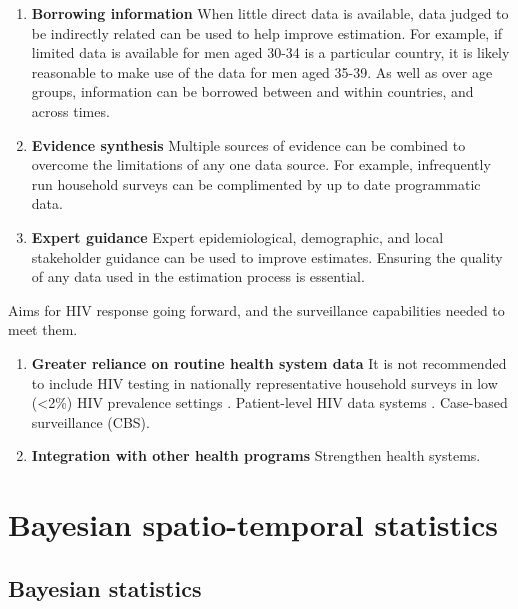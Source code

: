 \documentclass[a4paper, nobind]{templates/ociamthesis}
\providecommand{\tightlist}{%
  \setlength{\itemsep}{0pt}\setlength{\parskip}{0pt}}
\begin{document}
\begin{enumerate}
\def\labelenumi{\arabic{enumi}.}
\tightlist
\item
  \textbf{Borrowing information}
  When little direct data is available, data judged to be indirectly related can be used to help improve estimation.
  For example, if limited data is available for men aged 30-34 is a particular country, it is likely reasonable to make use of the data for men aged 35-39.
  As well as over age groups, information can be borrowed between and within countries, and across times.
\item
  \textbf{Evidence synthesis}
  Multiple sources of evidence can be combined to overcome the limitations of any one data source.
  For example, infrequently run household surveys can be complimented by up to date programmatic data.
\item
  \textbf{Expert guidance}
  Expert epidemiological, demographic, and local stakeholder guidance can be used to improve estimates.
  Ensuring the quality of any data used in the estimation process is essential.
\end{enumerate}

Aims for HIV response going forward, and the surveillance capabilities needed to meet them.

\begin{enumerate}
\def\labelenumi{\arabic{enumi}.}
\tightlist
\item
  \textbf{Greater reliance on routine health system data} It is not recommended to include HIV testing in nationally representative household surveys in low (\textless2\%) HIV prevalence settings \autocite{world2005guidelines}. Patient-level HIV data systems \autocite{world2017consolidated}. Case-based surveillance (CBS).
\item
  \textbf{Integration with other health programs} Strengthen health systems.
\end{enumerate}

\hypertarget{bayes-st}{%
\chapter{Bayesian spatio-temporal statistics}\label{bayes-st}}

\adjustmtc
{}

\hypertarget{bayesian-statistics}{%
\section{Bayesian statistics}\label{bayesian-statistics}}
\end{document}
